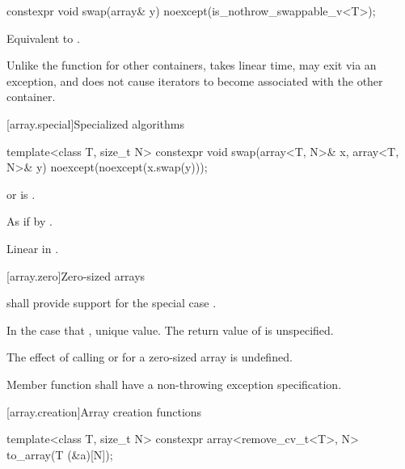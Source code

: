 %
\begin{itemdecl}
constexpr void swap(array& y) noexcept(is_nothrow_swappable_v<T>);
\end{itemdecl}

\begin{itemdescr}
\pnum
\effects
Equivalent to .

\pnum
\begin{note}
Unlike the  function for other containers, 
takes linear time, may exit via an exception, and does not cause iterators to
become associated with the other container.
\end{note}
\end{itemdescr}

[array.special]{Specialized algorithms}

%
\begin{itemdecl}
template<class T, size_t N>
  constexpr void swap(array<T, N>& x, array<T, N>& y) noexcept(noexcept(x.swap(y)));
\end{itemdecl}

\begin{itemdescr}
\pnum
\constraints
{} or  is .

\pnum
\effects
As if by .

\pnum
\complexity
Linear in .
\end{itemdescr}

[array.zero]{Zero-sized arrays}

%
\pnum
{} shall provide support for the special case .

\pnum
In the case that ,  unique value.
The return value of  is unspecified.

\pnum
The effect of calling  or  for a zero-sized array is
undefined.

\pnum
Member function  shall have a
non-throwing exception specification.

[array.creation]{Array creation functions}
%

%
\begin{itemdecl}
template<class T, size_t N>
  constexpr array<remove_cv_t<T>, N> to_array(T (&a)[N]);
\end{itemdecl}

